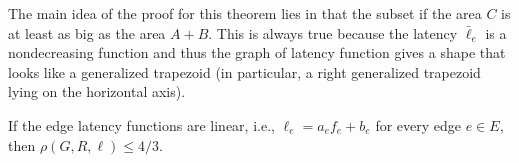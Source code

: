 \begin{proof-sketch}
    The main idea of the proof for this theorem lies in that the subset if the area $C$ is at least as big as the area $A+B$. This is always true because the latency $\bar{\ell}_e$ is a nondecreasing function and thus the graph of latency function gives a shape that looks like a generalized trapezoid (in particular, a right generalized trapezoid lying on the horizontal axis). 
\end{proof-sketch}

\begin{theorem}
    If the edge latency functions are linear, i.e., $\ell_e = a_ef_e + b_e$ for every edge $e \in E$, then $\rho(G, R,\ell) \leq 4/3$.
    \label{thm:linear}
\end{theorem}

